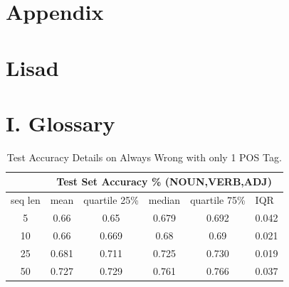 \documentclass[12pt]{article}
\renewcommand{\appendixname}{Lisad}%
\begin{document}
\newpage
%
  {\section*{Appendix}
  }%
  {\section*{Lisad}
  }


\section*{I. Glossary}
\begin{table}[!h]
\begin{tabular}{c|ccccc|}
\cline{2-6}
\multicolumn{1}{l|}{}         & \multicolumn{5}{c|}{Test Set Accuracy \% (NOUN,VERB,ADJ)}                                                                                                     \\ \hline
\multicolumn{1}{|c|}{seq len} & \multicolumn{1}{c|}{mean}  & \multicolumn{1}{c|}{quartile 25\%} & \multicolumn{1}{l|}{median} & \multicolumn{1}{l|}{quartile 75\%} & \multicolumn{1}{l|}{IQR} \\ \hline
\multicolumn{1}{|c|}{5}       & \multicolumn{1}{c|}{0.66}  & \multicolumn{1}{c|}{0.65}          & \multicolumn{1}{c|}{0.679}  & \multicolumn{1}{c|}{0.692}         & 0.042                    \\ \hline
\multicolumn{1}{|c|}{10}      & \multicolumn{1}{c|}{0.66}  & \multicolumn{1}{c|}{0.669}         & \multicolumn{1}{c|}{0.68}   & \multicolumn{1}{c|}{0.69}          & 0.021                    \\ \hline
\multicolumn{1}{|c|}{25}      & \multicolumn{1}{c|}{0.681} & \multicolumn{1}{c|}{0.711}         & \multicolumn{1}{c|}{0.725}  & \multicolumn{1}{c|}{0.730}         & 0.019                    \\ \hline
\multicolumn{1}{|c|}{50}      & \multicolumn{1}{c|}{0.727} & \multicolumn{1}{c|}{0.729}         & \multicolumn{1}{c|}{0.761}  & \multicolumn{1}{c|}{0.766}         & 0.037                    \\ \hline
\end{tabular}
\caption{Test Accuracy Details on Always Wrong with only 1 POS Tag.}
\label{appendix:alwayswrongonly1}
\end{table}
\end{document}
